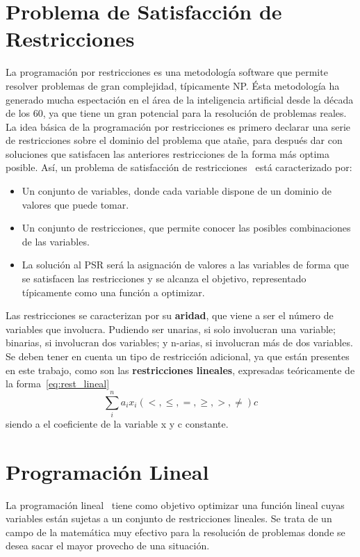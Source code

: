 \section{Problema de Satisfacción de Restricciones}
La programación por restricciones es una metodología software que permite resolver problemas de gran complejidad, típicamente NP. Ésta metodología ha generado mucha espectación en el área de la inteligencia artificial desde la década de los 60, ya que tiene un gran potencial para la resolución de problemas reales. La idea básica de la programación por restricciones es primero declarar una serie de restricciones sobre el dominio del problema que atañe, para después dar con soluciones que satisfacen las anteriores restricciones de la forma más optima posible. Así, un problema de satisfacción de restricciones~\cite{Russ06} está caracterizado por:
\begin{itemize}
	\item Un conjunto de variables, donde cada variable dispone de un dominio de valores que puede tomar.
	\item Un conjunto de restricciones, que permite conocer las posibles combinaciones de las variables.
	\item La solución al PSR será la asignación de valores a las variables de forma que se satisfacen las restricciones y se alcanza el objetivo, representado típicamente como una función a optimizar.
\end{itemize}
Las restricciones se caracterizan por su \textbf{aridad}, que viene a ser el número de variables que involucra. Pudiendo ser unarias, si solo involucran una variable; binarias, si involucran dos variables; y n-arias, si involucran más de dos variables. Se deben tener en cuenta un tipo de restricción adicional, ya que están presentes en este trabajo, como son las \textbf{restricciones lineales}, expresadas teóricamente de la forma~\ref{eq:rest_lineal}
\begin{equation}
  \label{eq:rest_lineal}
  \sum_{i}^{n} a_{i}x_{i} (<,\leq,=,\geq,>,\neq) c
\end{equation}
siendo a el coeficiente de la variable x y c constante.\\
\section{Programación Lineal}
La programación lineal~\cite{Loom64} tiene como objetivo optimizar una función lineal cuyas variables están sujetas a un conjunto de restricciones lineales.
Se trata de un campo de la matemática muy efectivo para la resolución de problemas donde se desea sacar el mayor provecho de una situación.\\


